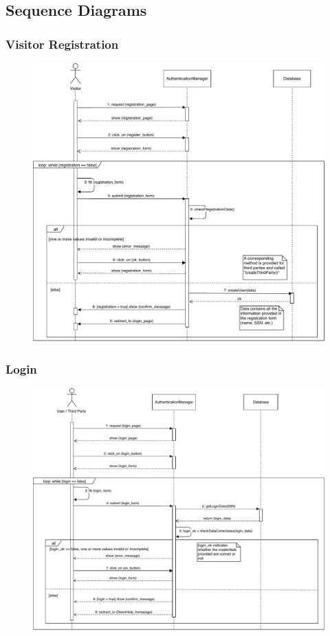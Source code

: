 \documentclass[12pt,a4paper]{article}
\begin{document}
	\subsection{Sequence Diagrams}
		\subsubsection{Visitor Registration}
			\begin{figure}[H]
				\centering
				\includegraphics[width=1.25\linewidth]{Images/registration_sequence}
				\label{fig:registration_sequence}
			\end{figure}
		\subsubsection{Login}
			\begin{figure}[H]
				\centering
				\includegraphics[width=1.2\linewidth]{Images/login_sequence}
				\label{fig:login_sequence}
			\end{figure}
\end{document}
